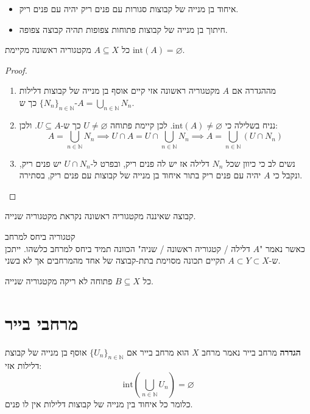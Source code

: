 \documentclass{tstextbook}
\begin{document}
\begin{lemma}
  \begin{itemize}
    \item איחוד בן מנייה של קבוצות סגורות עם פנים ריק יהיה עם פנים ריק.
    \item חיתוך בן מנייה של קבוצות פתוחות צפופות תהיה קבוצה צפופה.
  \end{itemize}
\end{lemma}
\begin{proposition}
כל \(A\subseteq X\) מקטגוריה ראשונה מקיימת \(\text{int}(A)=\varnothing\).

\end{proposition}
\begin{proof}
  \begin{enumerate}
    \item מההגדרה אם \(A\) מקטגוריה ראשונה אזי קיים אוסף בן מנייה של קבוצות דלילות \(\{ N_{n} \}_{n \in \mathbb{N}}\) כך ש-\(A=\bigcup_{n \in \mathbb{N}}N_{n}\).  


    \item נניח בשלילה כי \(\text{int}(A)\neq \varnothing\). לכן קיימת פתוחה \(U\neq \varnothing\) כך ש-\(U\subseteq A\). ולכן: 
$$A=\bigcup_{n \in \mathbb{N}}N_{n}\implies U\cap A=U\cap\bigcup_{n \in \mathbb{N}}N_{n}\implies A=\bigcup_{n \in \mathbb{N}}\left( U\cap N_{n} \right)$$


    \item נשים לב כי כיוון שכל \(N_{n}\) דלילה אז יש לה פנים ריק, ובפרט ל-\(U\cap N_{n}\) יש פנים ריק, ונקבל כי \(A\) יהיה עם פנים ריק בתור איחוד בן מנייה של קבוצות עם פנים ריק, בסתירה.  


  \end{enumerate}
\end{proof}
\begin{definition}
קבוצה שאיננה מקטגוריה ראשונה נקראת מקטגוריה שנייה.

\end{definition}
\begin{remark}
קטגוריה ביחס למרחב\\

כאשר נאמר "\(A\) דלילה / קטגוריה ראשונה / שניה" הכוונה תמיד ביחס למרחב כלשהו. 
ייתכן ש-\(A\subset Y\subset X\) תקיים תכונה מסוימת בתת-קבוצה של אחד מהמרחבים אך לא בשני.

\end{remark}
\begin{proposition}
כל \(B\subseteq X\) פתוחה לא ריקה מקטגוריה שנייה.

\section{מרחבי בייר}

\textbf{הגדרה} מרחב בייר
נאמר מרחב \(X\) הוא מרחב בייר אם  \(\{ U_{n} \}_{n \in \mathbb{N}}\) אוסף בן מנייה של קבוצת דלילות אזי:
$$\mathrm{int}\left( \bigcup_{n\in \mathbb{N}}U_{n} \right)=\varnothing $$
כלומר כל איחוד בין מנייה של קבוצות דלילות אין לו פנים.

\end{proposition}
\end{document}
